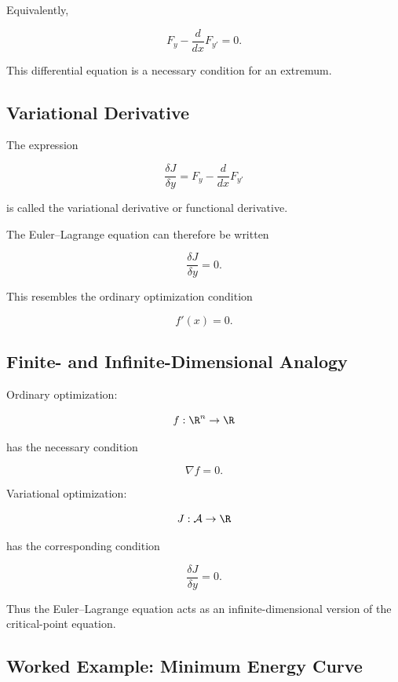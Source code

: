 Equivalently,

\[
\boxed{
F_y
-
\frac{d}{dx}F_{y'}
=
0.
}
\]

This differential equation is a necessary condition for an extremum.

\subsection{Variational Derivative}
\label{subsec:variational-derivative}

The expression

\[
\boxed{
\frac{\delta J}{\delta y}
=
F_y
-
\frac{d}{dx}F_{y'}
}
\]

is called the variational derivative or functional derivative.

The Euler--Lagrange equation can therefore be written

\[
\boxed{
\frac{\delta J}{\delta y}=0.
}
\]

This resembles the ordinary optimization condition

\[
\boxed{
f'(x)=0.
}
\]

\subsection{Finite- and Infinite-Dimensional Analogy}
\label{subsec:finite-infinite-variational-analogy}

Ordinary optimization:

\[
f:\R^n\to\R
\]

has the necessary condition

\[
\boxed{
\nabla f=0.
}
\]

Variational optimization:

\[
J:\mathcal{A}\to\R
\]

has the corresponding condition

\[
\boxed{
\frac{\delta J}{\delta y}=0.
}
\]

Thus the Euler--Lagrange equation acts as an infinite-dimensional version
of the critical-point equation.

\subsection{Worked Example: Minimum Energy Curve}
\label{subsec:worked-minimum-energy-curve}

